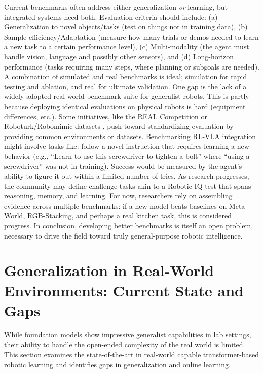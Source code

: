 Current benchmarks often address either generalization \textit{or} learning, but integrated systems need both. Evaluation criteria should include: (a) Generalization to novel objects/tasks (test on things not in training data), (b) Sample efficiency/Adaptation (measure how many trials or demos needed to learn a new task to a certain performance level), (c) Multi-modality (the agent must handle vision, language and possibly other sensors), and (d) Long-horizon performance (tasks requiring many steps, where planning or subgoals are needed). A combination of simulated and real benchmarks is ideal; simulation for rapid testing and ablation, and real for ultimate validation. One gap is the lack of a widely-adopted real-world benchmark suite for generalist robots. This is partly because deploying identical evaluations on physical robots is hard (equipment differences, etc.). Some initiatives, like the REAL Competition \cite{REAL2022} or Roboturk/Robomimic datasets \cite{TURK2016}, push toward standardizing evaluation by providing common environments or datasets. Benchmarking \ac{RL}-\ac{VLA} integration might involve tasks like: follow a novel instruction that requires learning a new behavior (e.g., ``Learn to use this screwdriver to tighten a bolt'' where ``using a screwdriver'' was not in training). Success would be measured by the agent’s ability to figure it out within a limited number of tries. As research progresses, the community may define challenge tasks akin to a Robotic IQ test that spans reasoning, memory, and learning. For now, researchers rely on assembling evidence across multiple benchmarks: if a new model beats baselines on Meta-World, RGB-Stacking, and perhaps a real kitchen task, this is considered progress. In conclusion, developing better benchmarks is itself an open problem, necessary to drive the field toward truly general-purpose robotic intelligence.

\section[Generalization in Real-World Environments]{Generalization in Real-World Environments: Current State and Gaps}

While foundation models show impressive generalist capabilities in lab settings, their ability to handle the open-ended complexity of the real world is limited. This section examines the state-of-the-art in real-world capable transformer-based robotic learning and identifies gaps in generalization and online learning.

